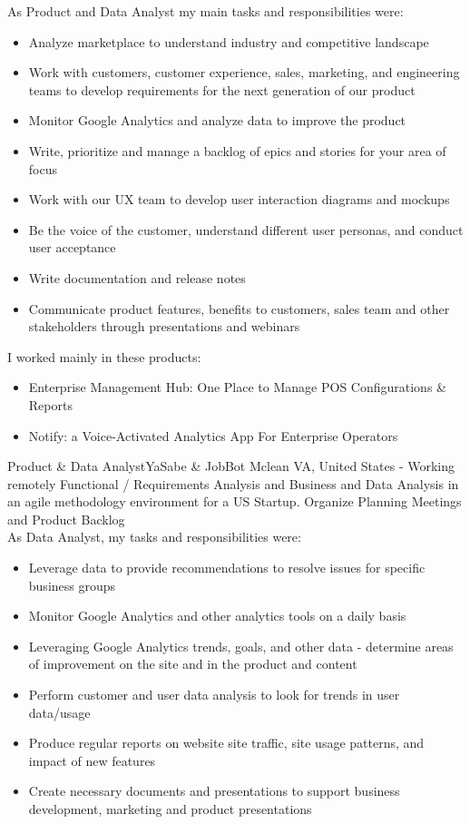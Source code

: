 \documentclass[11pt,a4paper,sans]{moderncv}
\begin{document}
As Product and Data Analyst my main tasks and responsibilities were:
\begin{itemize}
  \item Analyze marketplace to understand industry and competitive landscape
  \item Work with customers, customer experience, sales, marketing, and engineering teams to develop requirements for the next generation of our product
  \item Monitor Google Analytics and analyze data to improve the product
  \item Write, prioritize and manage a backlog of epics and stories for your area of focus
  \item Work with our UX team to develop user interaction diagrams and mockups
  \item Be the voice of the customer, understand different user personas, and conduct user acceptance
  \item Write documentation and release notes
  \item Communicate product features, benefits to customers, sales team and other stakeholders through presentations and webinars
\newline{}
\end{itemize}

I worked mainly in these products:
\begin{itemize}
  \item Enterprise Management Hub: One Place to Manage POS Configurations \& Reports
  \item Notify: a Voice-Activated Analytics App For Enterprise Operators
\newline
\newline
\end{itemize}

 {Product \& Data Analyst}{YaSabe \& JobBot  }{Mclean VA,  United States - Working remotely}{}{}{}
Functional / Requirements Analysis and Business and Data Analysis in an agile methodology environment for a US Startup. Organize Planning Meetings and Product Backlog
\\

As  Data Analyst, my tasks and responsibilities were:
\begin{itemize}
  \item Leverage data to provide recommendations to resolve issues for specific business groups
  \item Monitor Google Analytics and other analytics tools on a daily basis
  \item Leveraging Google Analytics trends, goals, and other data - determine areas of improvement on the site and in the product and content
  \item Perform customer and user data analysis to look for trends in user data/usage
  \item Produce regular reports on website site traffic, site usage patterns, and impact of new features
  \item Create necessary documents and presentations to support business development, marketing and product presentations
\newline
 \end{itemize}
\end{document}
